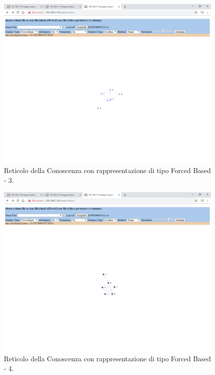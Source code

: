 \noindent
\begin{figure}[H]
\centering
	\includegraphics[width=1\linewidth]{./image/reticoloNonCorretto7.png}
	\caption{Reticolo della Conoscenza con rappresentazione di tipo Forced Based - 3.}
	\label{Reticolo della Conoscenza con rappresentazione di tipo Forced Based - 3.}
\end{figure}
\noindent
\begin{figure}[H]
\centering
	\includegraphics[width=1\linewidth]{./image/reticoloNonCorretto8.png}
	\caption{Reticolo della Conoscenza con rappresentazione di tipo Forced Based - 4.}
	\label{Reticolo della Conoscenza con rappresentazione di tipo Forced Based - 4.}
\end{figure}
